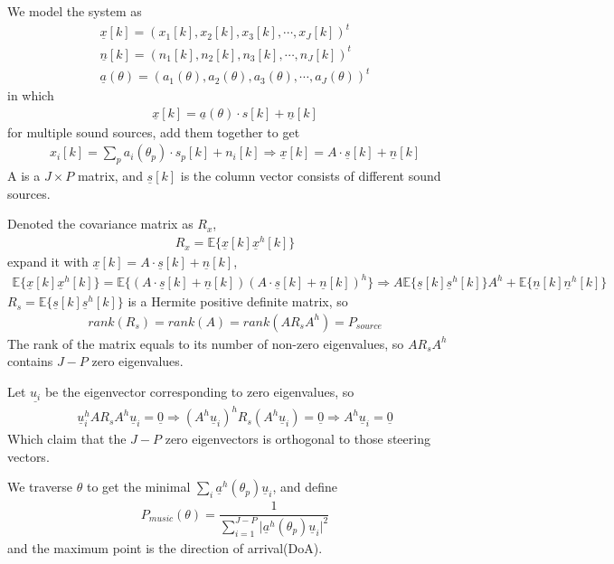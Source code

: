 \documentclass[UTF8]{article}
\newcommand{\ul}{\underline}
\begin{document}
We model the system as
\begin{gather*}
    \ul{x}[k] = (x_1[k], x_2[k], x_3[k], \cdots, x_J[k])^t \\
    \ul{n}[k] = (n_1[k], n_2[k], n_3[k], \cdots, n_J[k])^t \\
    \ul{a}(\theta) = (a_1(\theta), a_2(\theta), a_3(\theta), \cdots, a_J(\theta))^t
\end{gather*}
in which 
\begin{gather}
    \ul{x}[k] = \ul{a}(\theta)\cdot s[k] + \ul{n}[k]
\end{gather}
for multiple sound sources, add them together to get
\begin{gather}
    x_i[k] = \sum_{p}a_i(\theta_p)\cdot s_p[k] + n_i[k] \Rightarrow \ul{x}[k] = A \cdot \ul{s}[k] + \ul{n}[k]
\end{gather}
A is a $J \times P$ matrix, and $\ul{s}[k]$ is the column vector consists of different sound sources.

Denoted the covariance matrix as $R_x$, 
\begin{gather}
   R_x = \mathbb{E}\{\ul{x}[k]\ul{x}^h[k]\} 
\end{gather}
expand it with $\ul{x}[k] = A \cdot \ul{s}[k] + \ul{n}[k]$, 
\begin{gather}
    \mathbb{E}\{\ul{x}[k]\ul{x}^h[k]\} = \mathbb{E} \{ (A \cdot \ul{s}[k] + \ul{n}[k])(A \cdot \ul{s}[k] + \ul{n}[k])^h \} \Rightarrow A \mathbb{E}\{ \ul{s}[k]\ul{s}^h[k] \}A^h + \mathbb{E}\{ \ul{n}[k] \ul{n}^h[k]\}
\end{gather}
$R_s = \mathbb{E}\{ \ul{s}[k]\ul{s}^h[k] \}$ is a Hermite positive definite matrix, so 
\begin{gather*}
    rank(R_s) = rank(A) = rank(A R_s A^h) = P_{source}
\end{gather*}
The rank of the matrix equals to its number of non-zero eigenvalues, so $A R_s A^h$ contains $J - P$ zero eigenvalues. 

Let $\ul{u_i}$ be the eigenvector corresponding to zero eigenvalues, so 
\begin{gather}
    \ul{u}_i^h A R_s A^h \ul{u}_i = \ul{0} \Rightarrow (A^h\ul{u}_i)^h R_s (A^h \ul{u}_i) = \ul{0} \Rightarrow A^h\ul{u}_i = \ul{0}
\end{gather}
Which claim that the $J - P$ zero eigenvectors is orthogonal to those steering vectors.

We traverse $\theta$ to get the minimal $\sum_{i}\ul{a}^h(\theta_p)\ul{u}_i$, and define
\begin{gather}
    P_{music}(\theta) = \dfrac{1}{\sum_{i = 1}^{J - P}\big|\ul{a}^h(\theta_p)\ul{u}_i \big|^2}
\end{gather}
and the maximum point is the direction of arrival(DoA).
\end{document}
